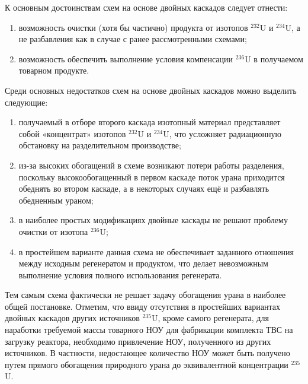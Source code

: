 К основным достоинствам схем на основе двойных каскадов следует отнести:

\begin{enumerate}
  \item	возможность очистки (хотя бы частично) продукта от изотопов $^{232}$U и $^{234}$U, а не разбавления как в случае с ранее рассмотренными схемами; 
  \item	возможность обеспечить выполнение условия компенсации $^{236}$U в получаемом товарном продукте.
\end{enumerate}

Среди основных недостатков схем на основе двойных каскадов можно выделить следующие: 
\begin{enumerate}
  \item	получаемый в отборе второго каскада изотопный материал представляет собой «концентрат» изотопов $^{232}$U и $^{234}$U, что усложняет радиационную обстановку на разделительном производстве; 
  \item	из-за высоких обогащений в схеме возникают потери работы разделения, поскольку высокообогащенный в первом каскаде поток урана приходится обеднять во втором каскаде, а в некоторых случаях ещё и разбавлять обедненным ураном;
  \item	в наиболее простых модификациях двойные каскады не решают проблему очистки от изотопа $^{236}$U;
  \item в простейшем варианте данная схема не обеспечивает заданного отношения между исходным регенератом и продуктом, что делает невозможным выполнение условия полного использования регенерата.
\end{enumerate}

Тем самым схема фактически не решает задачу обогащения урана в наиболее общей постановке.
Отметим, что ввиду отсутствия в простейших вариантах двойных каскадов других источников $^{235}$U, кроме самого регенерата, для наработки требуемой массы товарного НОУ для фабрикации комплекта ТВС на загрузку реактора, необходимо привлечение НОУ, полученного из других источников. В частности, недостающее количество НОУ может быть получено путем прямого обогащения природного урана до эквивалентной концентрации $^{235}$U.

